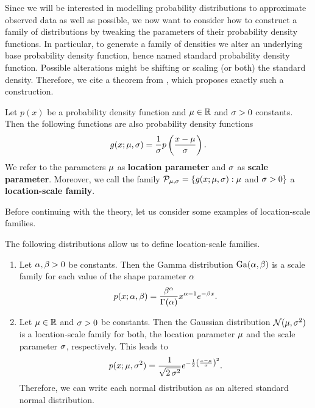 Since we will be interested in modelling probability distributions to approximate observed data as well as possible, we now want to consider how to construct a family of distributions by tweaking the parameters of their probability density functions. In particular, to generate a family of densities we alter an underlying base probability density function, hence named standard probability density function. Possible alterations might be shifting or scaling (or both) the standard density. Therefore, we cite a theorem from \cite[Theorem~2.1]{cinelli2021variational}, which proposes exactly such a construction.
\begin{theorem}\label{theorem:pdf_gen}
Let $p(x)$ be a probability density function and $\operatorname{\mu}\in\operatorname{\mathbb{R}}$ and $\operatorname{\sigma} > 0$ constants. Then the following functions are also probability density functions
\begin{align*}
g(x;\operatorname{\mu},\operatorname{\sigma}) = \frac{1}{\operatorname{\sigma}} p\left( \frac{x - \operatorname{\mu}}{\operatorname{\sigma}} \right).
\end{align*}
We refer to the parameters $\operatorname{\mu}$ as \textbf{location parameter} and $\operatorname{\sigma}$ as \textbf{scale parameter}. Moreover, we call the family $\mathcal{P}_{\operatorname{\mu},\operatorname{\sigma}} = \{g(x;\operatorname{\mu},\operatorname{\sigma}):\operatorname{\mu}$ and $\operatorname{\sigma} > 0\}$ a \textbf{location-scale family}.
\end{theorem}

Before continuing with the theory, let us consider some examples of location-scale families.

\begin{example}\label{ex:loc-scale_fam}
The following distributions allow us to define location-scale families.
\begin{enumerate}
\item Let $\alpha,\beta >0$ be constants. Then the Gamma distribution $\text{Ga}(\alpha,\beta)$ is a scale family for each value of the shape parameter $\alpha$
\begin{align*}
p(x;\alpha,\beta) = \frac{\beta^\alpha}{\Gamma(\alpha)}x^{\alpha-1} e^{-\beta x}.
\end{align*}
\item Let $\operatorname{\mu}\in\operatorname{\mathbb{R}}$ and $\operatorname{\sigma}>0$ be constants. Then the Gaussian distribution $\mathcal{N}(\operatorname{\mu},\operatorname{\sigma}^2)$ is a location-scale family for both, the location parameter $\operatorname{\mu}$ and the scale parameter $\operatorname{\sigma}$, respectively. This leads to
\begin{align*}
p(x; \operatorname{\mu}, \operatorname{\sigma}^2) = \frac{1}{\sqrt{2\operatorname{\sigma}^2}} e^{-\frac{1}{2} \left( \frac{x-\operatorname{\mu}}{\operatorname{\sigma}} \right)^2}.
\end{align*}
Therefore, we can write each normal distribution as an altered standard normal distribution.
\end{enumerate}
\end{example}


